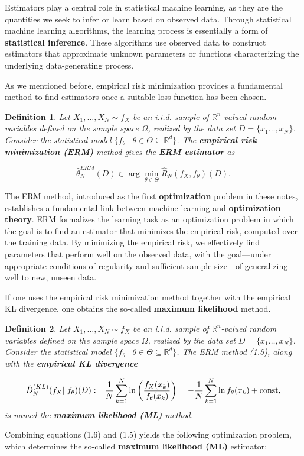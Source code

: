 \documentclass{report}
\newtheorem{definition}{Definition}[chapter]
\begin{document}
Estimators play a central role in statistical machine learning, as they are the quantities we seek to infer or learn based on observed data. Through statistical machine learning algorithms, the learning process is essentially a form of \textbf{statistical inference}. These algorithms use observed data to construct estimators that approximate unknown parameters or functions characterizing the underlying data-generating process.

As we mentioned before, empirical risk minimization provides a fundamental method to find estimators once a suitable loss function has been chosen.

\begin{definition}
Let $X_1,\dots,X_N \sim f_X$ be an i.i.d. sample of $\mathbb{R}^n$-valued random variables defined on the sample space $\Omega$, realized by the data set $D = \{x_1\dots,x_N\}$. Consider the statistical model $\{f_\theta \mid \theta \in \Theta \subseteq \mathbb{R}^d\}$. The \textbf{empirical risk minimization (ERM)} method gives the \textbf{ERM estimator} as

\begin{equation}
\hat{\theta}^{ERM}_N(D) \in \arg\min_{\theta \in \Theta}\hat{R}_N(f_X,f_\theta)(D).
\end{equation}
\end{definition}
The ERM method, introduced as the first \textbf{optimization} problem in these notes, establishes a fundamental link between machine learning and \textbf{optimization theory}. ERM formalizes the learning task as an optimization problem in which the goal is to find an estimator that minimizes the empirical risk, computed over the training data. By minimizing the empirical risk, we effectively find parameters that perform well on the observed data, with the goal—under appropriate conditions of regularity and sufficient sample size—of generalizing well to new, unseen data.

If one uses the empirical risk minimization method together with the empirical KL divergence, one obtains the so-called \textbf{maximum likelihood} method.

\begin{definition}
Let $X_1,\dots,X_N \sim f_X$ be an i.i.d. sample of $\mathbb{R}^n$-valued random variables defined on the sample space $\Omega$, realized by the data set $D=\{x_1\dots,x_N\}$. Consider the statistical model $\{f_\theta \mid \theta \in \Theta \subseteq \mathbb{R}^d\}$. The ERM method (1.5), along with the \textbf{empirical KL divergence}

\begin{equation}
\hat{D}^{(KL)}_N(f_X||f_\theta)(D) := \frac{1}{N} \sum_{k=1}^{N} \ln \left(\frac{f_X(x_k)}{f_\theta(x_k)}\right) = -\frac{1}{N} \sum_{k=1}^{N} \ln  f_\theta(x_k) + \textup{const},
\end{equation}
is named the \textbf{maximum likelihood (ML)} method.
\end{definition}
Combining equations (1.6) and (1.5) yields the following optimization problem, which determines the so-called \textbf{maximum likelihood (ML)} estimator:
\end{document}

